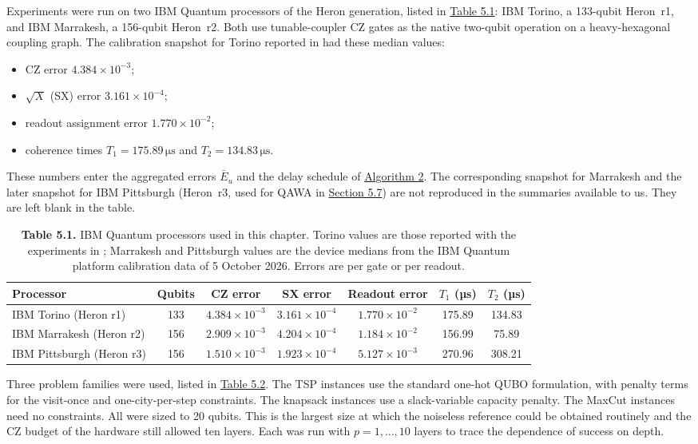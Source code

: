 \documentclass{report}
\theoremstyle{plain}
\theoremstyle{definition}
\theoremstyle{remark}
\begin{document}
Experiments were run on two IBM Quantum processors of the Heron generation, listed in \hyperref[tab:nisq:hw]{Table 5.1}: IBM Torino, a 133-qubit Heron~r1, and IBM Marrakesh, a 156-qubit Heron~r2. Both use tunable-coupler CZ gates as the native two-qubit operation on a heavy-hexagonal coupling graph. The calibration snapshot for Torino reported in \cite{guo2025deal} had these median values:
\begin{itemize}
\item CZ error $4.384\times 10^{-3}$;
\item $\sqrt{X}$ (SX) error $3.161\times 10^{-4}$;
\item readout assignment error $1.770\times 10^{-2}$;
\item coherence times $T_{1}=175.89\,\mathrm{\mu s}$ and $T_{2}=134.83\,\mathrm{\mu s}$.
\end{itemize}
These numbers enter the aggregated errors $\bar{E}_{u}$ and the delay schedule of \hyperref[alg:deal]{Algorithm 2}. The corresponding snapshot for Marrakesh and the later snapshot for IBM Pittsburgh (Heron~r3, used for QAWA in \hyperref[sec:nisq:qawa-results]{Section 5.7}) are not reproduced in the summaries available to us. They are left blank in the table.

\begin{table}[htbp]
\caption{\textbf{Table 5.1.} IBM Quantum processors used in this chapter. Torino values are those reported with the experiments in \cite{guo2025deal}; Marrakesh and Pittsburgh values are the device medians from the IBM Quantum platform calibration data of 5 October 2026. Errors are per gate or per readout.}
\label{tab:nisq:hw}
 \footnotesize
\begin{tabular}{lcccccc}
\toprule
Processor & Qubits & CZ error & SX error & Readout error & $T_{1}$ (µs) & $T_{2}$ (µs) \\
\midrule
IBM Torino (Heron r1)     & 133 & $4.384\times 10^{-3}$ & $3.161\times 10^{-4}$ & $1.770\times 10^{-2}$ & 175.89 & 134.83 \\
IBM Marrakesh (Heron r2)  & 156 & $2.909\times 10^{-3}$ & $4.204\times 10^{-4}$ & $1.184\times 10^{-2}$ & 156.99 & 75.89 \\
IBM Pittsburgh (Heron r3) & 156 & $1.510\times 10^{-3}$ & $1.923\times 10^{-4}$ & $5.127\times 10^{-3}$ & 270.96 & 308.21 \\
\bottomrule
\end{tabular}
\end{table}

Three problem families were used, listed in \hyperref[tab:nisq:problems]{Table 5.2}. The TSP instances use the standard one-hot QUBO formulation, with penalty terms for the visit-once and one-city-per-step constraints. The knapsack instances use a slack-variable capacity penalty. The MaxCut instances need no constraints. All were sized to 20 qubits. This is the largest size at which the noiseless reference could be obtained routinely and the CZ budget of the hardware still allowed ten layers. Each was run with $p=1,\dots,10$ layers to trace the dependence of success on depth.
\end{document}
